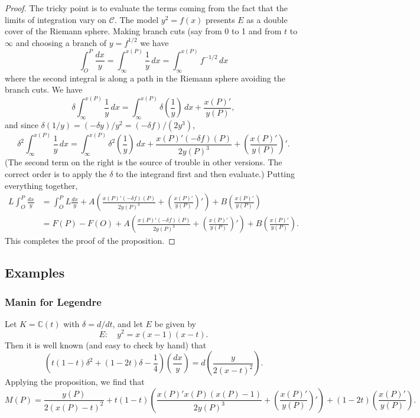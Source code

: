 \documentclass[12pt,reqno]{amsart}
\numberwithin{equation}{section}
\theoremstyle{plain}
\theoremstyle{definition}
\theoremstyle{remark}
\newcommand{\CC}{\mathcal{C}}
\newcommand{\C}{\mathbb{C}}
\newcommand{\<}{\langle}
\renewcommand{\>}{\rangle}
\numberwithin{equation}{section}
\begin{document}
\begin{proof}
The tricky point is to evaluate the terms coming from the fact
that the limits of integration vary on $\CC$.  The model $y^2=f(x)$
presents $E$ as a double cover of the Riemann sphere.  Making branch
cuts (say from 0 to 1 and from $t$ to $\infty$ and choosing a branch
of $y=f^{1/2}$ we have
\[\int_O^P\frac{dx}y=\int_{\infty}^{x(P)}\frac1y\,dx
=\int_{\infty}^{x(P)}f^{-1/2}\,dx\]
  where the second integral is along a path in the Riemann sphere
  avoiding the branch cuts.  We have
  \[\delta\int_{\infty}^{x(P)}\frac1y\,dx
    =\int_{\infty}^{x(P)}\delta\left(\frac1y\right)\,dx
    +\frac{x(P)'}{y(P)},\]
  and since $\delta(1/y)=(-\delta y)/y^2=(-\delta f)/(2y^3)$, 
  \[\delta^2\int_{\infty}^{x(P)}\frac1y\,dx
    =\int_{\infty}^{x(P)}\delta^2\left(\frac1y\right)\,dx
    +\frac{x(P)'(-\delta f)(P)}{2y(P)^3}
    +\left(\frac{x(P)'}{y(P)}\right)'.\]
  (The second term on the right is the source of trouble in other
  versions.  The correct order is to apply the $\delta$ to the
  integrand first and then evaluate.)
  Putting everything together,
  \begin{align*}
    L\int_O^P\frac{dx}y&=\int_O^PL\frac{dx}y
                         +A\left(\frac{x(P)'(-\delta f)(P)}{2y(P)^3}
                         +\left(\frac{x(P)'}{y(P)}\right)'\right)
                         +B\left(\frac{x(P)'}{y(P)}\right)\\
    &=F(P)-F(O)                     +A\left(\frac{x(P)'(-\delta f)(P)}{2y(P)^3}
                         +\left(\frac{x(P)'}{y(P)}\right)'\right)
                         +B\left(\frac{x(P)'}{y(P)}\right). 
  \end{align*}
This completes the proof of the proposition.
\end{proof}




\subsection{Examples}
\subsubsection{Manin for Legendre}
  Let $K=\C(t)$ with $\delta=d/dt$, and let $E$ be given by
  \[E:\quad y^2=x(x-1)(x-t).\]
Then it is well known (and easy to check by hand) that
  \[\left(t(1-t)\delta^2+(1-2t)\delta-\frac14\right)\left(\frac{dx}y\right)
    =d\left(\frac{y}{2(x-t)^2}\right).\]
  Applying the proposition, we find that
  \[M(P)=\frac{y(P)}{2(x(P)-t)^2}
    +t(1-t)\left(\frac{x(P)'x(P)(x(P)-1)}{2y(P)^3}+\left(\frac{x(P)'}{y(P)}\right)'\right)
    +(1-2t)\left(\frac{x(P)'}{y(P)}\right).\]
\end{document}
